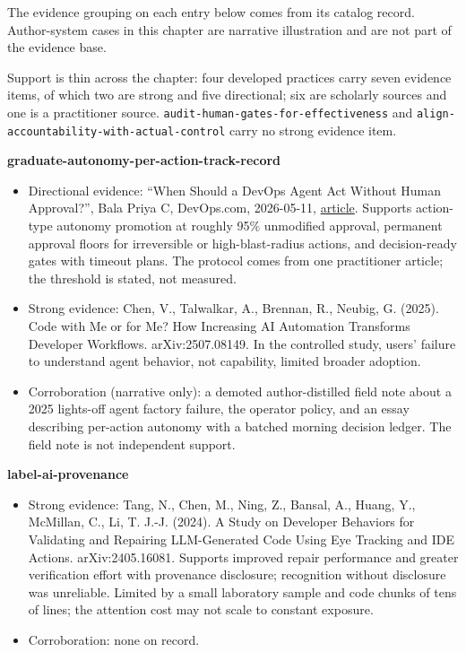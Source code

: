 The evidence grouping on each entry below comes from its catalog record. Author-system cases in this chapter are narrative illustration and are not part of the evidence base.

Support is thin across the chapter: four developed practices carry seven evidence items, of which two are strong and five directional; six are scholarly sources and one is a practitioner source. \texttt{audit-human-gates-for-effectiveness} and \texttt{align-accountability-with-actual-control} carry no strong evidence item.

\textbf{graduate-autonomy-per-action-track-record}

\begin{itemize}
\tightlist
\item
  Directional evidence: ``When Should a DevOps Agent Act Without Human Approval?'', Bala Priya C, DevOps.com, 2026-05-11, \href{https://devops.com/when-should-a-devops-agent-act-without-human-approval/}{article}. Supports action-type autonomy promotion at roughly 95\% unmodified approval, permanent approval floors for irreversible or high-blast-radius actions, and decision-ready gates with timeout plans. The protocol comes from one practitioner article; the threshold is stated, not measured.
\item
  Strong evidence: Chen, V., Talwalkar, A., Brennan, R., Neubig, G. (2025). Code with Me or for Me? How Increasing AI Automation Transforms Developer Workflows. arXiv:2507.08149. In the controlled study, users' failure to understand agent behavior, not capability, limited broader adoption.
\item
  Corroboration (narrative only): a demoted author-distilled field note about a 2025 lights-off agent factory failure, the operator policy, and an essay describing per-action autonomy with a batched morning decision ledger. The field note is not independent support.
\end{itemize}

\textbf{label-ai-provenance}

\begin{itemize}
\tightlist
\item
  Strong evidence: Tang, N., Chen, M., Ning, Z., Bansal, A., Huang, Y., McMillan, C., Li, T. J.-J. (2024). A Study on Developer Behaviors for Validating and Repairing LLM-Generated Code Using Eye Tracking and IDE Actions. arXiv:2405.16081. Supports improved repair performance and greater verification effort with provenance disclosure; recognition without disclosure was unreliable. Limited by a small laboratory sample and code chunks of tens of lines; the attention cost may not scale to constant exposure.
\item
  Corroboration: none on record.
\end{itemize}

